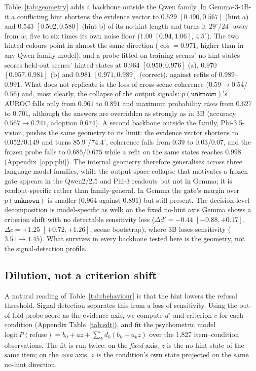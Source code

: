 \documentclass[10pt]{article}
\newcommand{\unknown}{\texttt{unknown}}
\newcommand{\punk}{p(\unknown)}
\newcommand{\wdir}{w}
\begin{document}
Table~\ref{tab:geometry} adds a backbone outside the Qwen family. In Gemma-3-4B-it a conflicting hint shortens the evidence vector to $0.529$ $[0.490,0.567]$ (hint a) and $0.543$ $[0.502,0.580]$ (hint b) of its no-hint length and turns it $29^\circ$/$24^\circ$ away from $\wdir$, five to six times its own noise floor ($1.00$ $[0.94,1.06]$, $4.5^\circ$). The two hinted colours point in almost the same direction ($\cos=0.971$, higher than in any Qwen-family model), and a probe fitted on training scenes' no-hint states scores held-out scenes' hinted states at $0.964$ $[0.950,0.976]$ (a), $0.970$ $[0.957,0.981]$ (b) and $0.981$ $[0.971,0.989]$ (correct), against refits of $0.989$--$0.991$. What does not replicate is the loss of cross-scene coherence ($0.59\to0.54$/$0.56$) and, most clearly, the collapse of the output signals: $\punk$'s AUROC falls only from $0.961$ to $0.891$ and maximum probability \emph{rises} from $0.627$ to $0.701$, although the answers are overridden as strongly as in 3B (accuracy $0.567\to0.241$, adoption $0.674$). A second backbone outside the family, Phi-3.5-vision, pushes the same geometry to its limit: the evidence vector shortens to $0.052$/$0.149$ and turns $85.9^\circ$/$74.4^\circ$, coherence falls from $0.39$ to $0.03$/$0.07$, and the frozen probe falls to $0.685$/$0.675$ while a refit on the same states reaches $0.998$ (Appendix~\ref{app:phi}). The internal geometry therefore generalises across three language-model families, while the output-space collapse that motivates a frozen gate appears in the Qwen2/2.5 and Phi-3 readouts but not in Gemma; it is readout-specific rather than family-general. In Gemma the gate's margin over $\punk$ is smaller ($0.964$ against $0.891$) but still present. The decision-level decomposition is model-specific as well: on the fixed no-hint axis Gemma shows a criterion shift with no detectable sensitivity loss ($\Delta d'=-0.44$ $[-0.88,+0.17]$, $\Delta c=+1.25$ $[+0.72,+1.26]$, scene bootstrap), where 3B loses sensitivity ($3.51\to1.45$). What survives in every backbone tested here is the geometry, not the signal-detection profile.

\subsection{Dilution, not a criterion shift}
\label{sec:sdt}

A natural reading of Table~\ref{tab:behaviour} is that the hint lowers the refusal threshold. Signal detection separates this from a loss of sensitivity. Using the out-of-fold probe score as the evidence axis, we compute $d'$ and criterion $c$ for each condition (Appendix Table~\ref{tab:sdt}), and fit the psychometric model $\mathrm{logit}\,P(\text{refuse})=b_0+az+\sum_k d_k(b_k+a_kz)$ over the 1{,}827 item--condition observations. The fit is run twice: on the \emph{fixed} axis, $z$ is the no-hint state of the same item; on the \emph{own} axis, $z$ is the condition's own state projected on the same no-hint direction.
\end{document}
